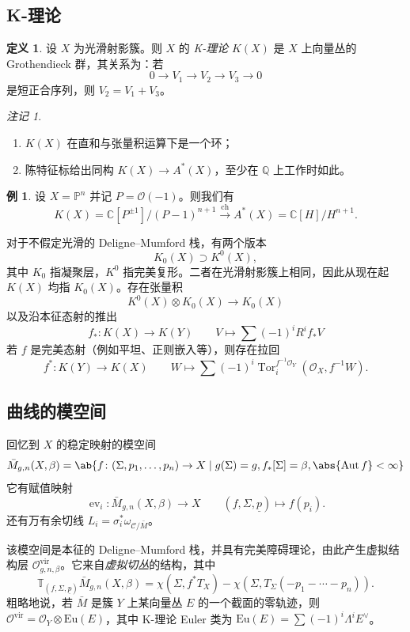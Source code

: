 \documentclass{amsart}
\theoremstyle{definition}
\newtheorem{defn}[thm]{定义}
\newtheorem{exm}[thm]{例}
\theoremstyle{remark}
\newtheorem{rmk}[thm]{注记}
\theoremstyle{plain}
\theoremstyle{definition}
\theoremstyle{remark}
\newcommand{\C}{\mathbb{C}}
\newcommand{\Q}{\mathbb{Q}}
\renewcommand{\P}{\mathbb{P}}
\newcommand{\mc}[1]{\mathcal{#1}}
\newcommand{\mr}[1]{\mathrm{#1}}
\newcommand{\on}[1]{\operatorname{#1}}
\newcommand{\ul}[1]{\underline{#1}}
\newcommand{\1}{\mathbf{1}}
\newcommand{\2}{\mathbf{2}}
\newcommand{\3}{\mathbf{3}}
\newcommand{\vir}{\mr{vir}}
\DeclareMathOperator{\Aut}{Aut}
\DeclareMathOperator{\ev}{ev}
\begin{document}
\subsection{K-理论}%
\label{sub:K-theory}

\begin{defn}
    设 \(X\) 为光滑射影簇。则 \(X\) 的 \textit{K-理论} \(K(X)\) 是 \(X\) 上向量丛的 Grothendieck 群，其关系为：若
    \[ 0 \to V_1 \to V_2 \to V_3 \to 0 \]
    是短正合序列，则 \(V_2 = V_1 + V_3\)。
\end{defn}

\begin{rmk}\leavevmode
    \begin{enumerate}
        \item \(K(X)\) 在直和与张量积运算下是一个环；
        \item 陈特征标给出同构 \(K(X) \to A^*(X)\)，至少在 \(\Q\) 上工作时如此。
    \end{enumerate}
\end{rmk}

\begin{exm}
    设 \(X = \P^n\) 并记 \(P = \mc{O}(-1)\)。则我们有
    \[ K(X) = \C[P^{\pm 1}]/(P-1)^{n+1} \xrightarrow{\on{ch}} A^*(X) = \C[H]/H^{n+1}. \]
\end{exm}

对于不假定光滑的 Deligne–Mumford 栈，有两个版本
\[ K_0(X) \supset K^0(X), \]
其中 \(K_0\) 指凝聚层，\(K^0\) 指完美复形。二者在光滑射影簇上相同，因此从现在起 \(K(X)\) 均指 \(K_0(X)\)。存在张量积
\[ K^0(X) \otimes K_0(X) \to K_0(X) \]
以及沿本征态射的推出
\[ f_* \colon K(X) \to K(Y) \qquad V \mapsto \sum (-1)^i R^i f_* V \]
若 \(f\) 是完美态射（例如平坦、正则嵌入等），则存在拉回
\[ f^* \colon K(Y) \to K(X) \qquad W \mapsto \sum (-1)^i \on{Tor}_i^{f^{-1} \mc{O}_Y} (\mc{O}_X, f^{-1} W). \]

\subsection{曲线的模空间}%
\label{sub:Moduli of curves}

回忆到 \(X\) 的稳定映射的模空间
\[ \bar{M}_{g,n}(X, \beta) = \ab\{ f \colon (\Sigma, p_1, \ldots, p_n) \to X \mid g(\Sigma) = g, f_*[\Sigma] = \beta, \abs{\Aut f} < \infty \} \]
它有赋值映射
\[ \ev_i \colon \bar{M}_{g,n}(X, \beta) \to X \qquad (f, \Sigma, \ul{p}) \mapsto f(p_i). \]
还有万有余切线 \(L_i = \sigma_i^* \omega_{ \mc{C}/\bar{M} }\)。

该模空间是本征的 Deligne–Mumford 栈，并具有完美障碍理论，由此产生虚拟结构层 \(\mc{O}^{\vir}_{g,n,\beta}\)。它来自\textit{虚拟切丛}的结构，其中
\[ \mathbb{T}_{(f, \Sigma, \ul{p})} \bar{M}_{g,n}(X, \beta) = \chi(\Sigma, f^* T_X) - \chi(\Sigma, T_{\Sigma}(-p_1 - \cdots - p_n)). \]
粗略地说，若 \(\bar{M}\) 是簇 \(Y\) 上某向量丛 \(E\) 的一个截面的零轨迹，则 \(\mc{O}^{\vir} = \mc{O}_Y \otimes \mr{Eu}(E)\)，其中 K-理论 Euler 类为 \(\mr{Eu}(E) = \sum (-1)^i \Lambda^i E^{\vee}\)。
\end{document}
